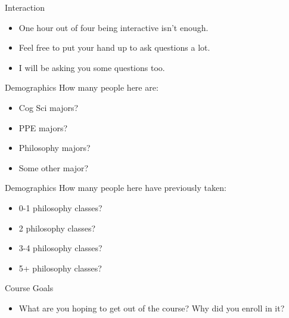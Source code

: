 \documentclass[
  17pt,
  letterpaper,
  ignorenonframetext,
  aspectratio=169,
]{beamer}
\providecommand{\tightlist}{%
  \setlength{\itemsep}{0pt}\setlength{\parskip}{0pt}}\usepackage{longtable,booktabs,array}
\begin{document}
\begin{frame}{Interaction}
\protect\hypertarget{interaction}{}
\begin{itemize}[<+->]
\tightlist
\item
  One hour out of four being interactive isn't enough.
\item
  Feel free to put your hand up to ask questions a lot.
\item
  I will be asking you some questions too.
\end{itemize}
\end{frame}

\begin{frame}{Demographics}
\protect\hypertarget{demographics}{}
How many people here are:

\begin{itemize}[<+->]
\tightlist
\item
  Cog Sci majors?
\item
  PPE majors?
\item
  Philosophy majors?
\item
  Some other major?
\end{itemize}
\end{frame}

\begin{frame}{Demographics}
\protect\hypertarget{demographics-1}{}
How many people here have previously taken:

\begin{itemize}[<+->]
\tightlist
\item
  0-1 philosophy classes?
\item
  2 philosophy classes?
\item
  3-4 philosophy classes?
\item
  5+ philosophy classes?
\end{itemize}
\end{frame}

\begin{frame}{Course Goals}
\protect\hypertarget{course-goals}{}
\begin{itemize}[<+->]
\tightlist
\item
  What are you hoping to get out of the course? Why did you enroll in
  it?
\end{itemize}
\end{frame}
\end{document}

